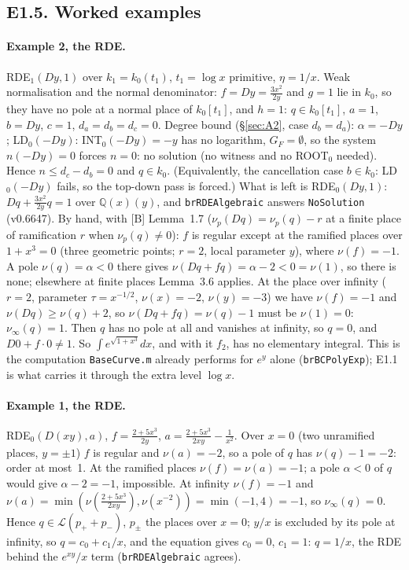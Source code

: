 \documentclass[11pt]{article}
\theoremstyle{definition}
\theoremstyle{remark}
\newcommand{\Q}{\mathbb{Q}}
\newcommand{\code}[1]{\texttt{#1}}
\begin{document}
\subsection*{E1.5. Worked examples}

\paragraph{Example 2, the RDE.} RDE$_1(Dy,1)$ over $k_1=k_0(t_1)$, $t_1=\log x$ primitive,
$\eta=1/x$. Weak normalisation and the normal denominator: $f=Dy=\frac{3x^2}{2y}$ and $g=1$
lie in $k_0$, so they have no pole at a normal place of $k_0[t_1]$, and $h=1$: $q\in
k_0[t_1]$, $a=1$, $b=Dy$, $c=1$, $d_a=d_b=d_c=0$. Degree bound (\S\ref{sec:A2}, case
$d_b=d_a$): $\alpha=-Dy$; LD$_0(-Dy)$: INT$_0(-Dy)=-y$ has no logarithm, $G_F=\emptyset$, so
the system $n(-Dy)=0$ forces $n=0$: no solution (no witness and no ROOT$_0$ needed). Hence $n\le d_c-d_b=0$ and $q\in k_0$.
(Equivalently, the cancellation case $b\in k_0$: LD$_0(-Dy)$ fails, so the top-down pass is
forced.) What is left is RDE$_0(Dy,1)$: $Dq+\frac{3x^2}{2y}q=1$ over $\Q(x)(y)$, and
\code{brRDEAlgebraic} answers \code{NoSolution} (v0.6647). By hand, with [B] Lemma~1.7
($\nu_p(Dq)=\nu_p(q)-r$ at a finite place of ramification $r$ when $\nu_p(q)\ne0$):
$f$ is regular except at the ramified places over $1+x^3=0$ (three geometric points; $r=2$,
local parameter $y$),
where $\nu(f)=-1$. A pole $\nu(q)=\alpha<0$ there gives $\nu(Dq+fq)=\alpha-2<0=\nu(1)$, so
there is none; elsewhere at finite places Lemma~3.6 applies. At the place over infinity
($r=2$, parameter $\tau=x^{-1/2}$, $\nu(x)=-2$, $\nu(y)=-3$) we have $\nu(f)=-1$ and
$\nu(Dq)\ge\nu(q)+2$, so $\nu(Dq+fq)=\nu(q)-1$ must be $\nu(1)=0$: $\nu_\infty(q)=1$. Then $q$
has no pole at all and vanishes at infinity, so $q=0$, and $D0+f\cdot0\ne1$. So $\int
e^{\sqrt{1+x^3}}dx$, and with it $f_2$, has no elementary integral. This is the computation
\code{BaseCurve.m} already performs for $e^y$ alone (\code{brBCPolyExp}); E1.1 is what carries
it through the extra level $\log x$.

\paragraph{Example 1, the RDE.} RDE$_0(D(xy),a)$, $f=\frac{2+5x^3}{2y}$,
$a=\frac{2+5x^3}{2xy}-\frac1{x^2}$. Over $x=0$ (two unramified places, $y=\pm1$) $f$ is regular
and $\nu(a)=-2$, so a pole of $q$ has $\nu(q)-1=-2$: order at most~1. At the ramified places
$\nu(f)=\nu(a)=-1$; a pole $\alpha<0$ of $q$ would give $\alpha-2=-1$, impossible. At infinity
$\nu(f)=-1$ and $\nu(a)=\min(\nu(\tfrac{2+5x^3}{2xy}),\nu(x^{-2}))=\min(-1,4)=-1$, so
$\nu_\infty(q)=0$. Hence $q\in\mathcal L(p_++p_-)$, $p_\pm$ the places over $x=0$; $y/x$ is
excluded by its pole at infinity, so $q=c_0+c_1/x$, and the equation gives $c_0=0$, $c_1=1$:
$q=1/x$, the RDE behind the $e^{xy}/x$ term (\code{brRDEAlgebraic} agrees).
\end{document}
